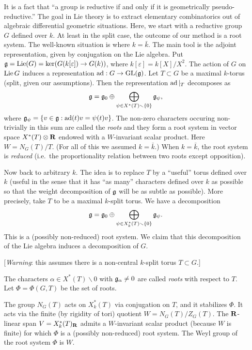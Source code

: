 \documentclass{article}
\begin{document}
It is a fact that ``a group is reductive if and only if it is geometrically 
pseudo-reductive.'' 
The goal in Lie theory is to extract elementary combinatorics out of 
algebraic differential geometric situations. Here, we start with a reductive 
group $G$ defined over $k$. At least in the split case, the outcome of our 
method is a root system. The well-known situation is where $k=\bar k$. 
The main tool is the adjoint representation, given by conjugation on the 
Lie algebra. Put 
$\mathfrak{g} = \operatorname{Lie}(G)=\ker(G(k[\varepsilon]) \to G(k))$, where $k[\varepsilon]=k[X]/X^2$. 
The action of $G$ on $\operatorname{Lie} G$ induces a representation 
$\operatorname{ad}:G\to \operatorname{GL}(\mathfrak{g})$. Let $T\subset G$ be a maximal 
$k$-torus (split, given our assumptions). Then the representation 
$\operatorname{ad}|_T$ decomposes as 
\[
  \mathfrak{g} = \mathfrak{g}_0 \oplus \bigoplus_{\psi\in X^\ast(T)\smallsetminus \{0\}} \mathfrak{g}_\psi ,
\]
where $\mathfrak{g}_\psi= \{v\in \mathfrak{g} :\operatorname{ad}(t) v = \psi(t) v\}$. The non-zero 
characters occuring non-trivially in this sum are called the 
\emph{roots} and they form a root system in vector space 
$X^\ast(T)\otimes \mathbf{R}$ endowed with a $W$-invariant scalar product. Here 
$W=N_G(T)/T$. (For all of this we assumed $k=\bar k$.) When 
$k=\bar k$, the root system is \emph{reduced} (i.e.\ the 
proportionality relation between two roots except opposition). 

Now back to arbitrary $k$. The idea is to replace $T$ by a ``useful'' torus 
defined over $k$ (useful in the sense that it has ``as many'' characters 
defined over $k$ as possible so that the weight decomposition of 
$\mathfrak{g}$ will be as subtle as possible). More precisely, take $T$ to be a 
maximal $k$-split torus. We have a decomposition 
\[
  \mathfrak{g} = \mathfrak{g}_0 \oplus \bigoplus_{\psi\in X_k^\ast(T)\smallsetminus \{0\}} \mathfrak{g}_\psi.
\]
This is a (possibly non-reduced) root system. We claim that this decomposition 
of the Lie algebra induces a decomposition of $G$. 

[\emph{Warning}: this assumes there is a non-central $k$-split torus $T\subset G$.]

The characters $\alpha\in X^\ast(T)\smallsetminus 0$ with $\mathfrak{g}_\alpha\ne 0$ are 
called \emph{roots} with respect to $T$. Let $\Phi=\Phi(G,T)$ be the set of 
roots. 

The group $N_G(T)$ acts on $X_k^\ast(T)$ via conjugation on $T$, and it stabilizes 
$\Phi$. It acts via the finite (by rigidity of tori) quotient 
$W=N_G(T)/Z_G(T)$. The $\mathbf{R}$-linear span $V=X_k^\ast(T)_{\mathbf{R}}$ admits a $W$-invariant 
scalar product (because $W$ is finite) for which $\Phi$ is a (possibly non-reduced) 
root system. The Weyl group of the root system $\Phi$ is $W$. 
\end{document}

